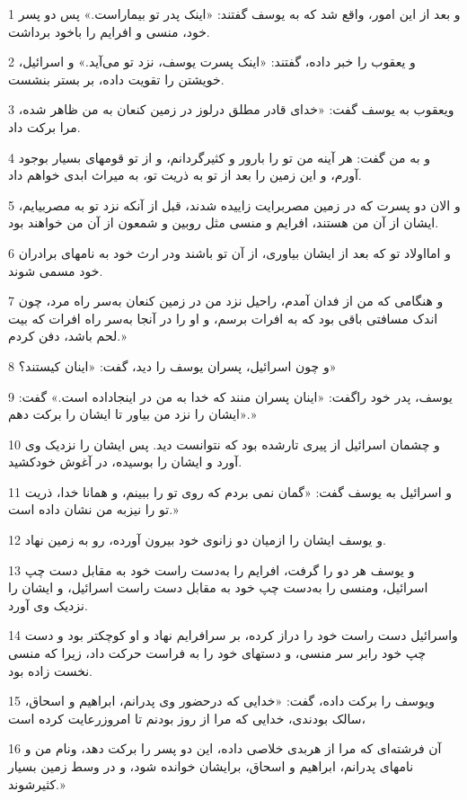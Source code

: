 \par 1 و بعد از این امور، واقع شد که به یوسف گفتند: «اینک پدر تو بیماراست.» پس دو پسر خود، منسی و افرایم را باخود برداشت.
\par 2 و یعقوب را خبر داده، گفتند: «اینک پسرت یوسف، نزد تو می‌آید.» و اسرائیل، خویشتن را تقویت داده، بر بستر بنشست.
\par 3 ویعقوب به یوسف گفت: «خدای قادر مطلق درلوز در زمین کنعان به من ظاهر شده، مرا برکت داد.
\par 4 و به من گفت: هر آینه من تو را بارور و کثیرگردانم، و از تو قومهای بسیار بوجود آورم، و این زمین را بعد از تو به ذریت تو، به میراث ابدی خواهم داد.
\par 5 و الان دو پسرت که در زمین مصربرایت زاییده شدند، قبل از آنکه نزد تو به مصربیایم، ایشان از آن من هستند، افرایم و منسی مثل روبین و شمعون از آن من خواهند بود.
\par 6 و امااولاد تو که بعد از ایشان بیاوری، از آن تو باشند ودر ارث خود به نامهای برادران خود مسمی شوند.
\par 7 و هنگامی که من از فدان آمدم، راحیل نزد من در زمین کنعان به‌سر راه مرد، چون اندک مسافتی باقی بود که به افرات برسم، و او را در آنجا به‌سر راه افرات که بیت لحم باشد، دفن کردم.»
\par 8 و چون اسرائیل، پسران یوسف را دید، گفت: «اینان کیستند؟»
\par 9 یوسف، پدر خود راگفت: «اینان پسران منند که خدا به من در اینجاداده است.» گفت: «ایشان را نزد من بیاور تا ایشان را برکت دهم.»
\par 10 و چشمان اسرائیل از پیری تارشده بود که نتوانست دید. پس ایشان را نزدیک وی آورد و ایشان را بوسیده، در آغوش خودکشید.
\par 11 و اسرائیل به یوسف گفت: «گمان نمی بردم که روی تو را ببینم، و همانا خدا، ذریت تو را نیزبه من نشان داده است.»
\par 12 و یوسف ایشان را ازمیان دو زانوی خود بیرون آورده، رو به زمین نهاد.
\par 13 و یوسف هر دو را گرفت، افرایم را به‌دست راست خود به مقابل دست چپ اسرائیل، ومنسی را به‌دست چپ خود به مقابل دست راست اسرائیل، و ایشان را نزدیک وی آورد.
\par 14 واسرائیل دست راست خود را دراز کرده، بر سرافرایم نهاد و او کوچکتر بود و دست چپ خود رابر سر منسی، و دستهای خود را به فراست حرکت داد، زیرا که منسی نخست زاده بود.
\par 15 ویوسف را برکت داده، گفت: «خدایی که درحضور وی پدرانم، ابراهیم و اسحاق، سالک بودندی، خدایی که مرا از روز بودنم تا امروزرعایت کرده است،
\par 16 آن فرشته‌ای که مرا از هربدی خلاصی داده، این دو پسر را برکت دهد، ونام من و نامهای پدرانم، ابراهیم و اسحاق، برایشان خوانده شود، و در وسط زمین بسیار کثیرشوند.»
